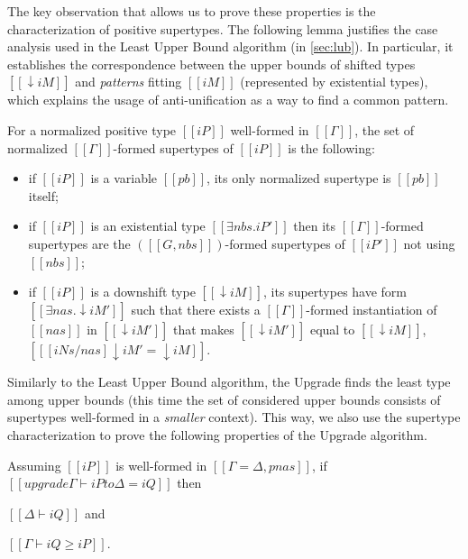     The key observation that allows us to prove these properties is the
    characterization of positive supertypes. The following lemma justifies the
    case analysis used in the Least Upper Bound algorithm (in \cref{sec:lub}).
    In particular, it establishes the correspondence between the upper bounds of
    shifted types $[[↓iM]]$ and \emph{patterns} fitting $[[iM]]$ (represented by
    existential types), which explains the usage of anti-unification as a way to
    find a common pattern. 

    \begin{lemma*}
        \label{lemma:char-supertypes}
        For a normalized positive type $[[iP]]$ well-formed in $[[Γ]]$,
        the set of normalized $[[Γ]]$-formed supertypes of $[[iP]]$ is the following:
        \begin{itemize}
            \item if $[[iP]]$ is a variable $[[pb]]$, its only normalized supertype is $[[pb]]$ itself;
            \item if $[[iP]]$ is an existential type $[[ ∃nbs.iP' ]]$ then 
                its $[[Γ]]$-formed supertypes are the $([[G, nbs]])$-formed supertypes of $[[iP']]$ not using $[[nbs]]$;
            \item if $[[iP]]$ is a downshift type $[[↓iM]]$, 
                its supertypes have form $[[∃nas.↓iM']]$ such that there exists
                a $[[Γ]]$-formed instantiation of $[[nas]]$ in $[[↓iM']]$
                that makes $[[↓iM']]$ equal to $[[↓iM]]$, \ie $[[ [iNs/nas] ↓iM' = ↓iM ]]$.
        \end{itemize}
    \end{lemma*}

    Similarly to the Least Upper Bound algorithm, the Upgrade finds the least type among upper bounds
    (this time the set of considered upper bounds consists of supertypes well-formed in a \emph{smaller} context).
    This way, we also use the supertype characterization to prove the following properties of the Upgrade algorithm. 

    \begin{lemma*}
        Assuming $[[iP]]$ is well-formed in $[[Γ = Δ, pnas]]$,
        if $[[upgrade Γ ⊢ iP to Δ = iQ]]$
        then
        \begin{enumerate*}
            \item $[[Δ ⊢ iQ]]$ and
            \item $[[Γ ⊢ iQ ≥ iP]]$.
        \end{enumerate*}
    \end{lemma*}

